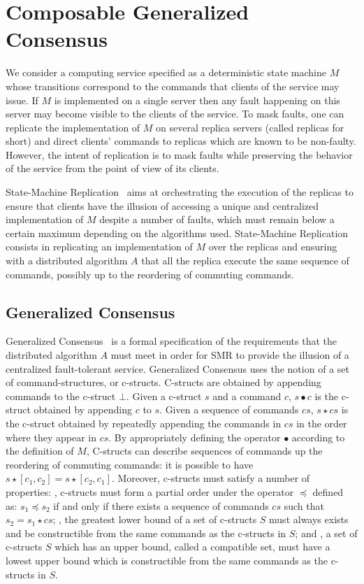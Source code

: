 \section{Composable Generalized Consensus}

We consider a computing service specified as a deterministic state machine $M$ whose transitions correspond to the commands that clients of the service may issue.
If $M$ is implemented on a single server then any fault happening on this server may become visible to the clients of the service.
To mask faults, one can replicate the implementation of $M$ on several replica servers (called replicas for short) and direct clients' commands to replicas which are known to be non-faulty.
However, the intent of replication is to mask faults while preserving the behavior of the service from the point of view of its clients.

State-Machine Replication~\cite{Schneider90ImplementingFaulttolerantServicesUsingStateMachine} aims at orchestrating the execution of the replicas to ensure that clients have the illusion of accessing a unique and centralized implementation of $M$ despite a number of faults, which must remain below a certain maximum depending on the algorithms used.
State-Machine Replication consists in replicating an implementation of $M$ over the replicas and ensuring with a distributed algorithm $A$ that all the replica execute the same sequence of commands, possibly up to the reordering of commuting commands.

\subsection{Generalized Consensus}

Generalized Consensus~\cite{Lamport05GeneralizeConsensus} is a formal specification of the requirements that the distributed algorithm $A$ must meet in order for SMR to provide the illusion of a centralized fault-tolerant service.
Generalized Consensus uses the notion of a set of command-structures, or c-structs. C-structs are obtained by appending commands to the c-struct $\bot$. Given a c-struct $s$ and a command $c$, $s \bullet c$ is the c-struct obtained by appending $c$ to $s$. Given a sequence of commands $cs$, $s\star cs$ is the c-struct obtained by repeatedly appending the commands in $cs$ in the order where they appear in $cs$. By appropriately defining the operator $\bullet$ according to the
definition of $M$, C-structs can describe sequences of commands up the reordering of commuting
commands: it is possible to have $s \star \left[c_1,c_2\right] = s \star \left[c_2,c_1\right]$.
Moreover, c-structs must satisfy a number of properties: , c-structs must form a partial order under the operator $\preceq$ defined as: $s_1 \preceq s_2$ if and only if there exists a sequence of commands $cs$ such that $s_2 = s_1 \star cs$; , the greatest lower bound of a set of c-structs $S$ must always exists and be constructible from the same commands as the c-structs in $S$; and , a set of c-structs $S$ which has an upper bound, called a compatible set, must have a lowest upper bound which is constructible from the same commands as the c-structs in $S$. 

